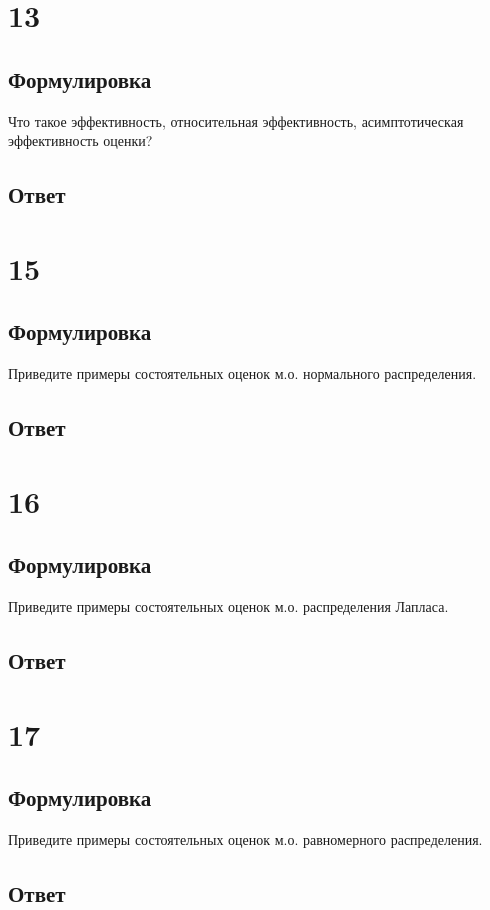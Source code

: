 \documentclass[a4]{article}
\begin{document}
	\section{13}
	\subsection*{Формулировка}
	Что такое эффективность, относительная эффективность, асимптотическая эффективность оценки?
	\subsection*{Ответ}
	
	
	\section{15}
	\subsection*{Формулировка}
	Приведите примеры состоятельных оценок м.о. нормального распределения.
	\subsection*{Ответ}
	
	\section{16}
	\subsection*{Формулировка}
	Приведите примеры состоятельных оценок м.о. распределения Лапласа.
	\subsection*{Ответ}
	
	\section{17}
	\subsection*{Формулировка}
	Приведите примеры состоятельных оценок м.о. равномерного распределения.
	\subsection*{Ответ}
	
\end{document}
